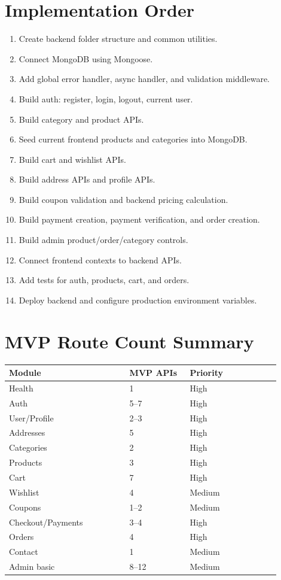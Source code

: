 \documentclass[11pt,a4paper]{article}
\begin{document}
\section{Implementation Order}

\begin{enumerate}
  \item Create backend folder structure and common utilities.
  \item Connect MongoDB using Mongoose.
  \item Add global error handler, async handler, and validation middleware.
  \item Build auth: register, login, logout, current user.
  \item Build category and product APIs.
  \item Seed current frontend products and categories into MongoDB.
  \item Build cart and wishlist APIs.
  \item Build address APIs and profile APIs.
  \item Build coupon validation and backend pricing calculation.
  \item Build payment creation, payment verification, and order creation.
  \item Build admin product/order/category controls.
  \item Connect frontend contexts to backend APIs.
  \item Add tests for auth, products, cart, and orders.
  \item Deploy backend and configure production environment variables.
\end{enumerate}

\section{MVP Route Count Summary}

\begin{longtable}{p{0.40\linewidth} p{0.20\linewidth} p{0.30\linewidth}}
\toprule
\textbf{Module} & \textbf{MVP APIs} & \textbf{Priority} \\
\midrule
Health & 1 & High \\
Auth & 5--7 & High \\
User/Profile & 2--3 & High \\
Addresses & 5 & High \\
Categories & 2 & High \\
Products & 3 & High \\
Cart & 7 & High \\
Wishlist & 4 & Medium \\
Coupons & 1--2 & Medium \\
Checkout/Payments & 3--4 & High \\
Orders & 4 & High \\
Contact & 1 & Medium \\
Admin basic & 8--12 & Medium \\
\bottomrule
\end{longtable}
\end{document}
